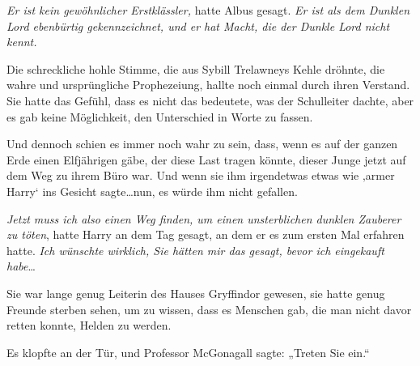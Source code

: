 \emph{Er ist kein gewöhnlicher Erstklässler,} hatte Albus gesagt. \emph{Er ist als dem Dunklen Lord ebenbürtig gekennzeichnet, und er hat Macht, die der Dunkle Lord nicht kennt.}

Die schreckliche hohle Stimme, die aus Sybill Trelawneys Kehle dröhnte, die wahre und ursprüngliche Prophezeiung, hallte noch einmal durch ihren Verstand. Sie hatte das Gefühl, dass es nicht das bedeutete, was der Schulleiter dachte, aber es gab keine Möglichkeit, den Unterschied in Worte zu fassen.

Und dennoch schien es immer noch wahr zu sein, dass, wenn es auf der ganzen Erde einen Elfjährigen gäbe, der diese Last tragen könnte, dieser Junge jetzt auf dem Weg zu ihrem Büro war. Und wenn sie ihm irgendetwas etwas wie ‚armer Harry‘ ins Gesicht sagte…nun, es würde ihm nicht gefallen.

\emph{Jetzt muss ich also einen Weg finden, um einen unsterblichen dunklen Zauberer zu töten}, hatte Harry an dem Tag gesagt, an dem er es zum ersten Mal erfahren hatte. \emph{Ich wünschte wirklich, Sie hätten mir das gesagt, bevor ich eingekauft habe}…

Sie war lange genug Leiterin des Hauses Gryffindor gewesen, sie hatte genug Freunde sterben sehen, um zu wissen, dass es Menschen gab, die man nicht davor retten konnte, Helden zu werden.

Es klopfte an der Tür, und Professor McGonagall sagte: „Treten Sie ein.“

